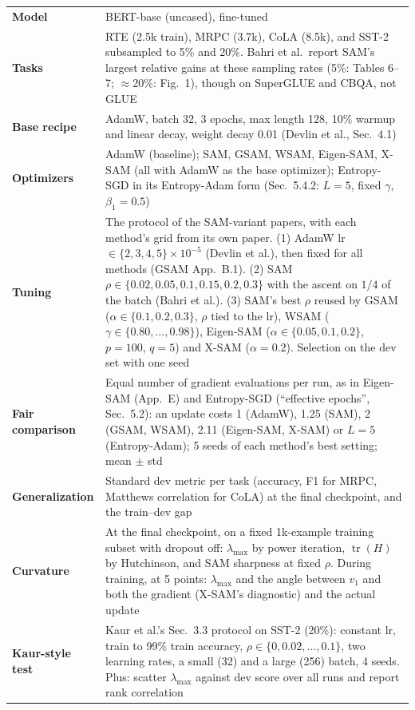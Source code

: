 \documentclass[11pt]{article}
\newcommand{\lmax}{\lambda_{\max}}
\newcommand{\tr}{\operatorname{tr}}
\theoremstyle{plain}
\begin{document}
\begin{center}\small
\begin{tabularx}{\textwidth}{@{}p{3.2cm}L@{}}
\toprule
\textbf{Model} & BERT-base (uncased), fine-tuned \\
\textbf{Tasks} & RTE (2.5k train), MRPC (3.7k), CoLA (8.5k), and SST-2 subsampled to 5\% and 20\%. Bahri et al.\ report SAM's largest relative gains at these sampling rates (5\%: Tables 6--7; $\approx$20\%: Fig.~1), though on SuperGLUE and CBQA, not GLUE \\
\textbf{Base recipe} & AdamW, batch 32, 3 epochs, max length 128, 10\% warmup and linear decay, weight decay 0.01 (Devlin et al., Sec.~4.1) \\
\textbf{Optimizers} & AdamW (baseline); SAM, GSAM, WSAM, Eigen-SAM, X-SAM (all with AdamW as the base optimizer); Entropy-SGD in its Entropy-Adam form (Sec.~5.4.2: $L=5$, fixed $\gamma$, $\beta_1=0.5$) \\
\textbf{Tuning} & The protocol of the SAM-variant papers, with each method's grid from its own paper. (1) AdamW lr $\in\{2,3,4,5\}\times10^{-5}$ (Devlin et al.), then fixed for all methods (GSAM App.~B.1). (2) SAM $\rho\in\{0.02,0.05,0.1,0.15,0.2,0.3\}$ with the ascent on $1/4$ of the batch (Bahri et al.). (3) SAM's best $\rho$ reused by GSAM ($\alpha\in\{0.1,0.2,0.3\}$, $\rho$ tied to the lr), WSAM ($\gamma\in\{0.80,\dots,0.98\}$), Eigen-SAM ($\alpha\in\{0.05,0.1,0.2\}$, $p=100$, $q=5$) and X-SAM ($\alpha=0.2$). Selection on the dev set with one seed \\
\textbf{Fair comparison} & Equal number of gradient evaluations per run, as in Eigen-SAM (App.~E) and Entropy-SGD (``effective epochs'', Sec.~5.2): an update costs 1 (AdamW), 1.25 (SAM), 2 (GSAM, WSAM), 2.11 (Eigen-SAM, X-SAM) or $L=5$ (Entropy-Adam); 5 seeds of each method's best setting; mean $\pm$ std \\
\textbf{Generalization} & Standard dev metric per task (accuracy, F1 for MRPC, Matthews correlation for CoLA) at the final checkpoint, and the train--dev gap \\
\textbf{Curvature} & At the final checkpoint, on a fixed 1k-example training subset with dropout off: $\lmax$ by power iteration, $\tr(H)$ by Hutchinson, and SAM sharpness at fixed $\rho$. During training, at 5 points: $\lmax$ and the angle between $v_1$ and both the gradient (X-SAM's diagnostic) and the actual update \\
\textbf{Kaur-style test} & Kaur et al.'s Sec.~3.3 protocol on SST-2 (20\%): constant lr, train to 99\% train accuracy, $\rho\in\{0,0.02,\dots,0.1\}$, two learning rates, a small (32) and a large (256) batch, 4 seeds. Plus: scatter $\lmax$ against dev score over all runs and report rank correlation \\
\bottomrule
\end{tabularx}
\end{center}
\end{document}
